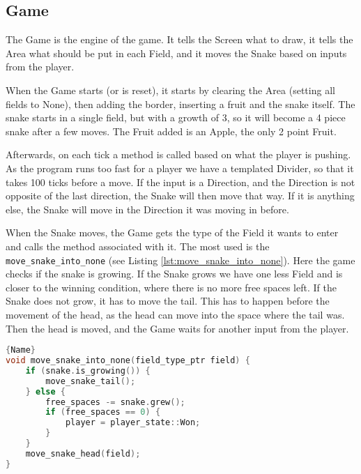 \subsection{Game}

The Game is the engine of the game. It tells the Screen what to draw, it tells the Area what should be put in each Field, and it moves the Snake based on inputs from the player.

When the Game starts (or is reset), it starts by clearing the Area (setting all fields to None), then adding the border, inserting a fruit and the snake itself. The snake starts in a single field, but with a growth of 3, so it will become a 4 piece snake after a few moves. The Fruit added is an Apple, the only 2 point Fruit.

Afterwards, on each tick a method is called based on what the player is pushing. As the program runs too fast for a player we have a templated Divider, so that it takes 100 ticks before a move. If the input is a Direction, and the Direction is not opposite of the last direction, the Snake will then move that way. If it is anything else, the Snake will move in the Direction it was moving in before.

When the Snake moves, the Game gets the type of the Field it wants to enter and calls the method associated with it. The most used is the \texttt{move\_snake\_into\_none} (see Listing \ref{lst:move_snake_into_none}). Here the game checks if the snake is growing. If the Snake grows we have one less Field and is closer to the winning condition, where there is no more free spaces left. If the Snake does not grow, it has to move the tail. This has to happen before the movement of the head, as the head can move into the space where the tail was. Then the head is moved, and the Game waits for another input from the player.

\begin{lstlisting}[caption={Moving the Snake into an empty Field},label={lst:move_snake_into_none},frame=tlrb, language=C++]{Name}
void move_snake_into_none(field_type_ptr field) {
    if (snake.is_growing()) {
        move_snake_tail();
    } else {
        free_spaces -= snake.grew();
        if (free_spaces == 0) {
            player = player_state::Won;
        }
    }
  	move_snake_head(field);
}
\end{lstlisting}
